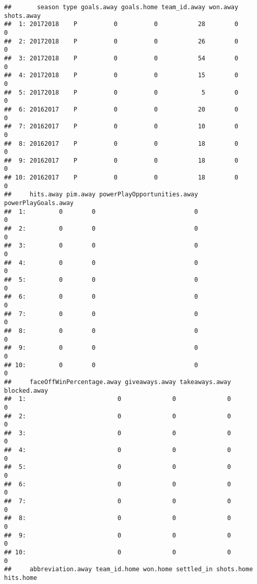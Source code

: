 \documentclass[
]{article}
\begin{document}
\begin{verbatim}
##       season type goals.away goals.home team_id.away won.away shots.away
##  1: 20172018    P          0          0           28        0          0
##  2: 20172018    P          0          0           26        0          0
##  3: 20172018    P          0          0           54        0          0
##  4: 20172018    P          0          0           15        0          0
##  5: 20172018    P          0          0            5        0          0
##  6: 20162017    P          0          0           20        0          0
##  7: 20162017    P          0          0           10        0          0
##  8: 20162017    P          0          0           18        0          0
##  9: 20162017    P          0          0           18        0          0
## 10: 20162017    P          0          0           18        0          0
##     hits.away pim.away powerPlayOpportunities.away powerPlayGoals.away
##  1:         0        0                           0                   0
##  2:         0        0                           0                   0
##  3:         0        0                           0                   0
##  4:         0        0                           0                   0
##  5:         0        0                           0                   0
##  6:         0        0                           0                   0
##  7:         0        0                           0                   0
##  8:         0        0                           0                   0
##  9:         0        0                           0                   0
## 10:         0        0                           0                   0
##     faceOffWinPercentage.away giveaways.away takeaways.away blocked.away
##  1:                         0              0              0            0
##  2:                         0              0              0            0
##  3:                         0              0              0            0
##  4:                         0              0              0            0
##  5:                         0              0              0            0
##  6:                         0              0              0            0
##  7:                         0              0              0            0
##  8:                         0              0              0            0
##  9:                         0              0              0            0
## 10:                         0              0              0            0
##     abbreviation.away team_id.home won.home settled_in shots.home hits.home

\end{verbatim}
\end{document}
